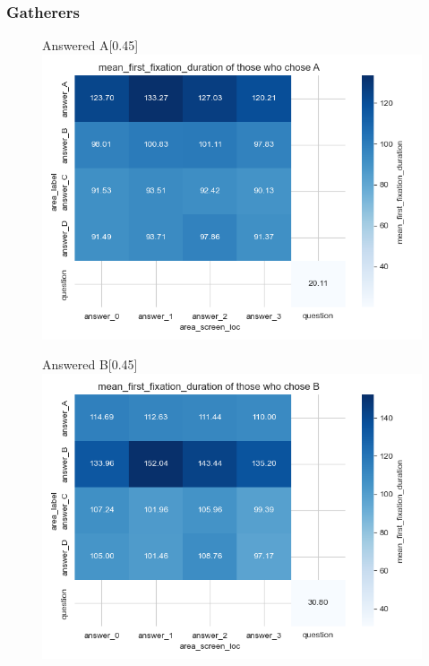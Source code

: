 \documentclass{article}
\begin{document}
\subsubsection{Gatherers}

\begin{figure}[H]
  \centering
  \begin{subcaptionbox}{Answered A\label{fig:A_ff_g}}[0.45\textwidth]
    {\centering\includegraphics[width=\linewidth]{plots/matrix_plots/matrix_mean_first_fixation_duration_A_gatherers.png}}
  \end{subcaptionbox}
  \hfill
  \begin{subcaptionbox}{Answered B\label{fig:B_ff_g}}[0.45\textwidth]
    {\centering\includegraphics[width=\linewidth]{plots/matrix_plots/matrix_mean_first_fixation_duration_B_gatherers.png}}
  \end{subcaptionbox}
  

\end{figure}
\end{document}
